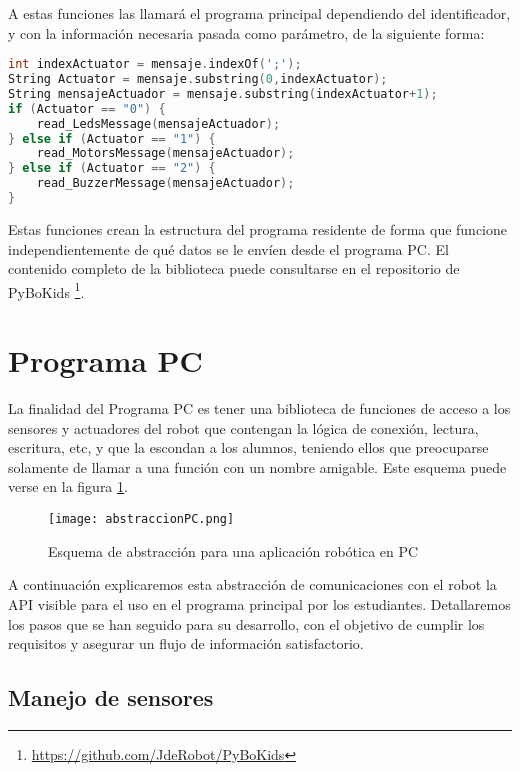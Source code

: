 A estas funciones las llamará el programa principal dependiendo del identificador, y con la información necesaria pasada como parámetro, de la siguiente forma:

\begin{lstlisting}[language=C,caption={Decisión sobre los actuadores con el primer valor del mensaje}]
int indexActuator = mensaje.indexOf(';');
String Actuator = mensaje.substring(0,indexActuator);
String mensajeActuador = mensaje.substring(indexActuator+1);
if (Actuator == "0") {
	read_LedsMessage(mensajeActuador);
} else if (Actuator == "1") {
	read_MotorsMessage(mensajeActuador);
} else if (Actuator == "2") {
	read_BuzzerMessage(mensajeActuador);
}
\end{lstlisting}

Estas funciones crean la estructura del programa residente de forma que funcione independientemente de qué datos se le envíen desde el programa PC. El contenido completo de la biblioteca puede consultarse en el repositorio de PyBoKids  \footnote{\href{https://github.com/JdeRobot/PyBoKids}{https://github.com/JdeRobot/PyBoKids}}.\\

\section{Programa PC}\label{sec:pc}
La finalidad del Programa PC es tener una biblioteca de funciones de acceso a los sensores y actuadores del robot que contengan la lógica de conexión, lectura, escritura, etc, y que la escondan a los alumnos, teniendo ellos que preocuparse solamente de llamar a una función con un nombre amigable. Este esquema puede verse en la figura \ref{img:abstraccionPC}.

\begin{figure}[h]
	\texttt{[image: abstraccionPC.png]}
	\centering
	\caption{Esquema de abstracción para una aplicación robótica en PC}
	\label{img:abstraccionPC}
\end{figure}

A continuación explicaremos esta abstracción de comunicaciones con el robot la API visible para el uso en el programa principal por los estudiantes. Detallaremos los pasos que se han seguido para su desarrollo, con el objetivo de cumplir los requisitos y asegurar un flujo de información satisfactorio.

\subsection{Manejo de sensores}\label{subsec:sensoresPython}

